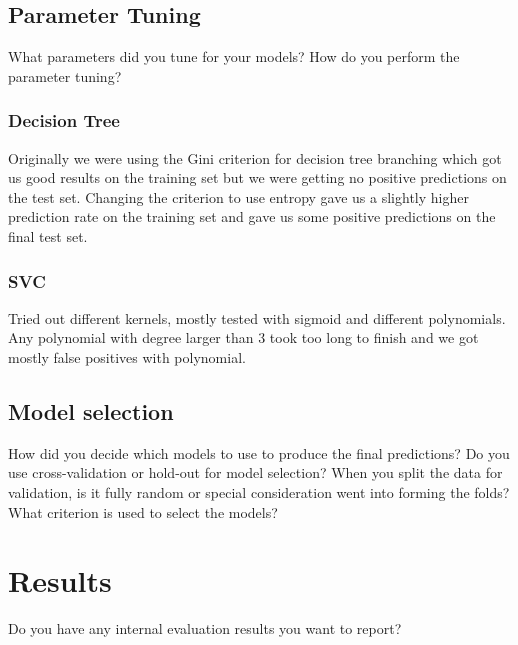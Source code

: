 \documentclass[11pt,a4paper]{article}
\begin{document}
\subsection{Parameter Tuning}
What parameters did you tune for your models? How do you perform the parameter tuning?

\subsubsection{Decision Tree}
Originally we were using the Gini criterion for decision tree branching which got us good results on the training set but we were getting no positive predictions on the test set.
Changing the criterion to use entropy gave us a slightly higher prediction rate on the training set and gave us some positive predictions on the final test set.

\subsubsection{SVC}
Tried out different kernels, mostly tested with sigmoid and different polynomials.
Any polynomial with degree larger than 3 took too long to finish and we got mostly false positives with polynomial.

\subsection{Model selection}
How did you decide which models to use to produce the final predictions?  Do you use cross-validation or hold-out for model selection? When you split the data for validation, is it fully random or special consideration went into forming the folds? What criterion is used to select the models?

\section{Results}
Do you have any internal evaluation results you want to report?
\end{document}
